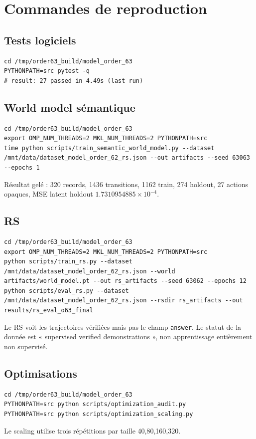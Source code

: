 \documentclass[11pt,a4paper]{article}
\newcommand{\code}[1]{\texttt{#1}}
\begin{document}
\section{Commandes de reproduction}
\subsection{Tests logiciels}
\begin{lstlisting}
cd /tmp/order63_build/model_order_63
PYTHONPATH=src pytest -q
# result: 27 passed in 4.49s (last run)
\end{lstlisting}

\subsection{World model sémantique}
\begin{lstlisting}
cd /tmp/order63_build/model_order_63
export OMP_NUM_THREADS=2 MKL_NUM_THREADS=2 PYTHONPATH=src
time python scripts/train_semantic_world_model.py --dataset /mnt/data/dataset_model_order_62_rs.json --out artifacts --seed 63063 --epochs 1
\end{lstlisting}
Résultat gelé : 320 records, 1436 transitions, 1162 train, 274 holdout, 27 actions opaques, MSE latent holdout $1.7310954885\times10^{-4}$.

\subsection{RS}
\begin{lstlisting}
cd /tmp/order63_build/model_order_63
export OMP_NUM_THREADS=2 MKL_NUM_THREADS=2 PYTHONPATH=src
python scripts/train_rs.py --dataset /mnt/data/dataset_model_order_62_rs.json --world artifacts/world_model.pt --out rs_artifacts --seed 63062 --epochs 12
python scripts/eval_rs.py --dataset /mnt/data/dataset_model_order_62_rs.json --rsdir rs_artifacts --out results/rs_eval_o63_final
\end{lstlisting}
Le RS voit les trajectoires vérifiées mais pas le champ \code{answer}. Le statut de la donnée est « supervised verified demonstrations », non apprentissage entièrement non supervisé.

\subsection{Optimisations}
\begin{lstlisting}
cd /tmp/order63_build/model_order_63
PYTHONPATH=src python scripts/optimization_audit.py
PYTHONPATH=src python scripts/optimization_scaling.py
\end{lstlisting}
Le scaling utilise trois répétitions par taille 40,80,160,320.
\end{document}
